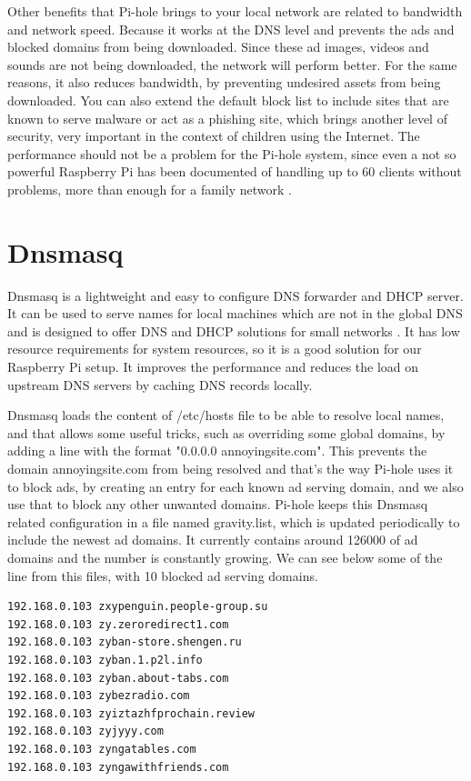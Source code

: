 Other benefits that Pi-hole brings to your local network are related to bandwidth and network speed. Because it works at the DNS level and prevents the ads and blocked domains from being downloaded. Since these ad images, videos and sounds are not being downloaded, the network will perform better. For the same reasons, it also reduces bandwidth, by preventing undesired assets from being downloaded. You can also extend the default block list to include sites that are known to serve malware or act as a phishing site, which brings another level of security, very important in the context of children using the Internet. The performance should not be a problem for the Pi-hole system, since even a not so powerful Raspberry Pi has been documented of handling up to 60 clients without problems, more than enough for a family network \citep{salmela20177things}.

\section{Dnsmasq}

Dnsmasq is a lightweight and easy to configure DNS forwarder and DHCP server. It can be used to serve names for local machines which are not in the global DNS and is designed to offer DNS and DHCP solutions for small networks \citep{debianHowToDnsmasq}.
It has low resource requirements for system resources, so it is a good solution for our Raspberry Pi setup. It improves the performance and reduces the load on upstream DNS servers by caching DNS records locally.

Dnsmasq loads the content of /etc/hosts file to be able to resolve local names, and that allows some useful tricks, such as overriding some global domains, by adding a line with the format "0.0.0.0 annoyingsite.com". This prevents the domain annoyingsite.com from being resolved and that's the way Pi-hole uses it to block ads, by creating an entry for each known ad serving domain, and we also use that to block any other unwanted domains. Pi-hole keeps this Dnsmasq related configuration in a file named gravity.list, which is updated periodically to include the newest ad domains. It currently contains around 126000 of ad domains and the number is constantly growing. We can see below some of the line from this files, with 10 blocked ad serving domains.

\begin{lstlisting}
192.168.0.103 zxypenguin.people-group.su
192.168.0.103 zy.zeroredirect1.com
192.168.0.103 zyban-store.shengen.ru
192.168.0.103 zyban.1.p2l.info
192.168.0.103 zyban.about-tabs.com
192.168.0.103 zybezradio.com
192.168.0.103 zyiztazhfprochain.review
192.168.0.103 zyjyyy.com
192.168.0.103 zyngatables.com
192.168.0.103 zyngawithfriends.com
\end{lstlisting}

